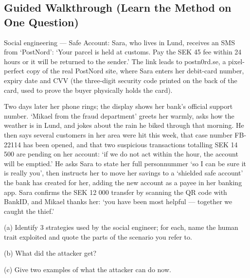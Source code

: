 \documentclass[12pt, a4paper]{article}
\begin{document}
\subsection*{Guided Walkthrough (Learn the Method on One Question)}

\begin{problembox}
Social engineering --- Safe Account: Sara, who lives in Lund, receives an SMS from `PostNord': `Your parcel is held at customs. Pay the SEK 45 fee within 24 hours or it will be returned to the sender.' The link leads to postn0rd.se, a pixel-perfect copy of the real PostNord site, where Sara enters her debit-card number, expiry date and CVV (the three-digit security code printed on the back of the card, used to prove the buyer physically holds the card).

Two days later her phone rings; the display shows her bank's official support number. `Mikael from the fraud department' greets her warmly, asks how the weather is in Lund, and jokes about the rain he biked through that morning.
He then says several customers in her area were hit this week, that case number FB-22114 has been opened, and that two suspicious transactions totalling SEK 14 500 are pending on her account: `if we do not act within the hour, the account will be emptied.' He asks Sara to state her full personnummer `so I can be sure it is really you', then instructs her to move her savings to a `shielded safe account' the bank has created for her, adding the new account as a payee in her banking app.
Sara confirms the SEK 12 000 transfer by scanning the QR code with BankID, and Mikael thanks her: `you have been most helpful --- together we caught the thief.'

(a) Identify 3 strategies used by the social engineer; for each, name the human trait exploited and quote the parts of the scenario you refer to.

(b) What did the attacker get?

(c) Give two examples of what the attacker can do now.
\end{problembox}
\end{document}
